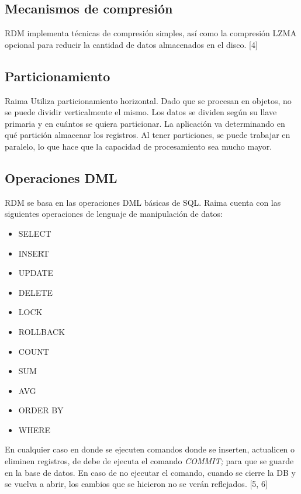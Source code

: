 \documentclass{acmart}
\begin{document}
\subsection{Mecanismos de compresión}
RDM implementa técnicas de compresión simples, así como la compresión LZMA opcional para reducir la cantidad de datos almacenados en el disco. [4]
\subsection{Particionamiento}
Raima Utiliza particionamiento horizontal. Dado que se procesan en objetos, no se puede dividir verticalmente el mismo. Los datos se dividen según su llave primaria y en cuántos se quiera particionar. La aplicación va determinando en qué partición almacenar los registros. Al tener particiones, se puede trabajar en paralelo, lo que hace que la capacidad de procesamiento sea mucho mayor.
\subsection{Operaciones DML}
RDM se basa en las operaciones DML básicas de SQL.
Raima cuenta con las siguientes operaciones de lenguaje de manipulación de datos:\par
\begin{itemize}
    \item SELECT\par
	\item INSERT\par
	\item UPDATE\par
	\item DELETE\par
	\item LOCK\par
	\item ROLLBACK\par
	\item COUNT\par
	\item SUM\par
	\item AVG\par
	\item ORDER BY\par
	\item WHERE\par
\end{itemize}

En cualquier caso en donde se ejecuten comandos donde se inserten, actualicen o eliminen registros, de debe de ejecuta el comando \textit{COMMIT;} para que se guarde en la base de datos. En caso de no ejecutar el comando, cuando se cierre la DB y se vuelva a abrir, los cambios que se hicieron no se verán reflejados. [5, 6]
\end{document}

